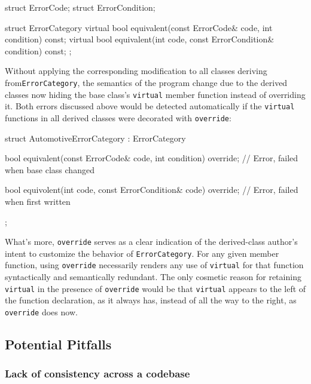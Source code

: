 \begin{emcppshiddenlisting}[emcppsbatch=e2]
struct ErrorCode;
struct ErrorCondition;
\end{emcppshiddenlisting}
\begin{emcppslisting}[emcppsbatch=e2]
struct ErrorCategory
{
    virtual bool equivalent(const ErrorCode& code, int condition) const;
    virtual bool equivalent(int code, const ErrorCondition& condition) const;
};
\end{emcppslisting}

Without applying the corresponding modification to all classes deriving
from\linebreak[4] \lstinline!ErrorCategory!, the semantics of the program change due to
the derived classes now hiding
the base class's
\lstinline!virtual! member function instead of overriding it. Both errors discussed above
would be detected automatically if the \lstinline!virtual!
functions in all derived classes were decorated with \lstinline!override!:

\begin{emcppslisting}[emcppsbatch=e2]
struct AutomotiveErrorCategory : ErrorCategory
{
    bool equivalent(const ErrorCode& code, int condition) override;
        // Error, failed when base class changed

    bool equivolent(int code, const ErrorCondition& code) override;
        // Error, failed when first written
};
\end{emcppslisting}

\noindent What's more, \lstinline!override! serves as a clear indication of the derived-class author's intent to customize the
behavior of \lstinline!ErrorCategory!. For any given member function, using \lstinline!override! necessarily renders any use of \lstinline!virtual! for
that function syntactically and semantically redundant. The only
cosmetic reason for retaining \lstinline!virtual! in the presence of
\lstinline!override! would be that \lstinline!virtual! appears to the left of
the function declaration, as it always has, instead of all the way to
the right, as \lstinline!override! does now.

\subsection[Potential Pitfalls]{Potential Pitfalls}\label{potential-pitfalls}

\subsubsection[Lack of consistency across a codebase]{Lack of consistency across a codebase}\label{lack-of-consistency-across-a-codebase}

